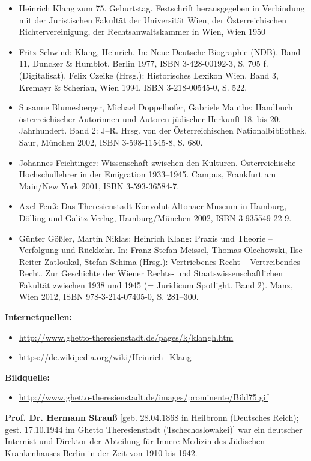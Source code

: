 \documentclass[a4paper]{article}
\begin{document}
\begin{itemize}
\item Heinrich Klang zum 75. Geburtstag. Festschrift herausgegeben in Verbindung mit der Juristischen Fakultät der
Universität Wien, der Österreichischen Richtervereinigung, der Rechtsanwaltskammer in Wien, Wien 1950 
\item Fritz Schwind: Klang, Heinrich. In: Neue Deutsche Biographie (NDB). Band 11, Duncker \& Humblot, Berlin 1977, ISBN
3-428-00192-3, S. 705 f. (Digitalisat). Felix Czeike (Hrsg.): Historisches Lexikon Wien. Band 3, Kremayr \& Scheriau,
Wien 1994, ISBN 3-218-00545-0, S. 522. 
\item Susanne Blumesberger, Michael Doppelhofer, Gabriele Mauthe: Handbuch österreichischer Autorinnen und Autoren
jüdischer Herkunft 18. bis 20. Jahrhundert. Band 2: J–R. Hrsg. von der Österreichischen Nationalbibliothek. Saur,
München 2002, ISBN 3-598-11545-8, S. 680. 
\item Johannes Feichtinger: Wissenschaft zwischen den Kulturen. Österreichische Hochschullehrer in der Emigration
1933–1945. Campus, Frankfurt am Main/New York 2001, ISBN 3-593-36584-7. 
\item Axel Feuß: Das Theresienstadt-Konvolut Altonaer Museum in Hamburg, Dölling und Galitz Verlag, Hamburg/München
2002, ISBN 3-935549-22-9. 
\item Günter Gößler, Martin Niklas: Heinrich Klang: Praxis und Theorie – Verfolgung und Rückkehr. In: Franz-Stefan
Meissel, Thomas Olechowski, Ilse Reiter-Zatloukal, Stefan Schima (Hrsg.): Vertriebenes Recht – Vertreibendes Recht. Zur
Geschichte der Wiener Rechts- und Staatswissenschaftlichen Fakultät zwischen 1938 und 1945 (= Juridicum Spotlight. Band
2). Manz, Wien 2012, ISBN 978-3-214-07405-0, S. 281–300.
\end{itemize}

\bigskip


\bigskip

\textbf{Internetquellen:}

\begin{itemize}
\item \url{http://www.ghetto-theresienstadt.de/pages/k/klangh.htm} 
\item \url{https://de.wikipedia.org/wiki/Heinrich_Klang} 
\end{itemize}

\bigskip

\textbf{Bildquelle:}

\begin{itemize}
\item \url{http://www.ghetto-theresienstadt.de/images/prominente/Bild75.gif} 
\end{itemize}
\textbf{Prof. Dr. Hermann Strauß} [geb. 28.04.1868 in Heilbronn (Deutsches Reich); gest. 17.10.1944 im Ghetto
Theresienstadt (Tschechoslowakei)] war ein deutscher Internist und Direktor der Abteilung für Innere Medizin des
Jüdischen Krankenhauses Berlin in der Zeit von 1910 bis 1942.
\end{document}
